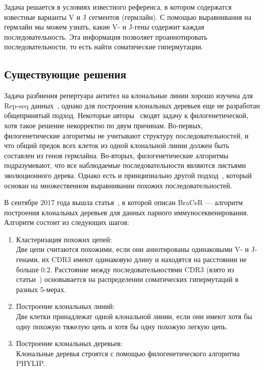 \documentclass{spbau-diploma}
\begin{document}
Задача решается в условиях известного референса, в котором содержатся известные варианты V и J сегментов (гермлайн). 
С помощью выравнивания на гермлайн мы можем узнать, какие V- и J-гены содержит каждая последовательность. 
Эта информация позволяет проаннотировать последовательности, то есть найти соматические гипермутации.


\subsection{Существующие решения}

Задача разбиения репертуара антител на клональные линии хорошо изучена для Rep-seq данных~\cite{davidsen2018benchmarking}, однако для построения клональных деревьев еще не разработан общепринятый подход. 
Некоторые авторы~\cite{hoehn2016diversity} сводят задачу к филогенетической, хотя такое решение некорректно по двум причинам. 
Во-первых, филогенетические алгоритмы не учитывают структуру последовательностей, и что общий предок всех клеток из одной клональной линии должен быть составлен из генов гермлайна. 
Во-вторых, филогенетические алгоритмы подразумевают, что все наблюдаемые последовательности являются листьями эволюционного дерева. 
Однако есть и принципиально другой подход~\cite{horns2016lineage}, который основан на множественном выравнивании похожих последовательностей. 

В сентябре $2017$ года вышла статья~\cite{lindeman2017bracer}, в которой описан BraCeR --- алгоритм построения клональных деревьев для данных парного иммуносеквенирования. 
Алгоритм состоит из следующих шагов:
\begin{enumerate}
    \item Кластеризация похожих цепей: \\
    Две цепи считаются похожими, если они аннотированы одинаковыми V- и J-генами, их CDR3 имеют одинаковую длину и находятся на расстоянии не больше $0.2$. 
    Расстояние между последовательностями CDR3 (взято из статьи~\cite{yaari2013models}) основывается на распределении соматических гипермутаций в разных $5$-мерах.
    \item Построение клональных линий: \\
    Две клетки принадлежат одной клональной линии, если они имеют хотя бы одну похожую тяжелую цепь и хотя бы одну похожую легкую цепь. 
    \item Построение клональных деревьев:  \\
    Клональные деревья строятся с помощью филогенетического алгоритма PHYLIP. 
\end{enumerate}
\end{document}
